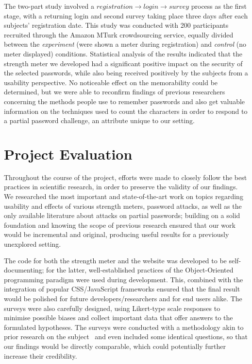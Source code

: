     The two-part study involved a $registration \rightarrow login \rightarrow survey$ process as the first stage, with a returning login and second survey taking place three days after each subjects' registration date. This study was conducted with 200 participants recruited through the Amazon MTurk crowdsourcing service, equally divided between the \emph{experiment} (were shown a meter during registration) and \emph{control} (no meter displayed) conditions. Statistical analysis of the results indicated that the strength meter we developed had a significant positive impact on the security of the selected passwords, while also being received positively by the subjects from a usability perspective. No noticeable effect on the memorability could be determined, but we were able to reconfirm findings of previous researchers~\cite{strength_meter_effect} concerning the methods people use to remember passwords and also get valuable information on the techniques used to count the characters in order to respond to a partial password challenge, an attribute unique to our setting.


  \section{Project Evaluation}
    \label{sec:evaluation}
    Throughout the course of the project, efforts were made to closely follow the best practices in scientific research, in order to preserve the validity of our findings. We researched the most important and state-of-the-art work on topics regarding usability and effects of various strength meters, password attacks, as well as the only available literature about attacks on partial passwords; building on a solid foundation and knowing the scope of previous research ensured that our work would be incremental and original, producing useful results for a previously unexplored setting.

    The code for both the strength meter and the website was developed to be self-documenting; for the latter, well-established practices of the Object-Oriented programming paradigm were used during development. This, combined with the integration of popular CSS/JavaScript frameworks ensured that the final result would be polished for future developers/researchers and for end users alike. The surveys were also carefully designed, using Likert-type scale responses to minimise possible biases and collect important data that offer answers to the formulated hypotheses. The surveys were conducted with a methodology akin to prior research on the subject~\cite{pass_strength,strength_meter_effect,strength_meter_impact} and even included some identical questions, so that our findings would be directly comparable, which could potentially further increase their credibility.

